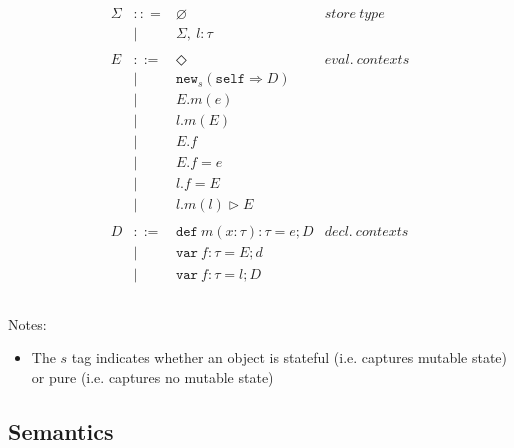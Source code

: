 \documentclass{llncs}
\newcommand{\keywadj}[1]{\mathtt{#1}}
\newcommand{\keyw}[1]{\keywadj{#1}~}
\begin{document}
\[\begin{array}{lll}
\begin{array}{lllr}
&&\\
\Sigma & :: = & \varnothing & store~type\\
& | & \Sigma,~l : \tau\\
&&\\
E & ::= & \Diamond & eval.~ contexts\\
  & |   & \keywadj{new}_{s}(\keywadj{self} \Rightarrow D) \\
  & |   & E.m(e)\\
  & |   & l.m(E)\\
  & |   & E.f \\
  & |   & E.f = e \\
  & |   & l.f = E \\
  & |   & l.m(l) \rhd E \\
&&\\
D & ::= & \keyw{def} m(x:\tau):\tau = e; D & decl.~ contexts\\
  & |   & \keyw{var} f:\tau = E; d \\
  & |   & \keyw{var} f:\tau = l; D \\
&&\\
\end{array}
\end{array}
\]

Notes:

\begin{itemize}
\item The $s$ tag indicates whether an object is stateful (i.e. captures mutable state) or pure (i.e. captures no mutable state)
\end{itemize}


\newpage

\subsection{Semantics}
\end{document}
